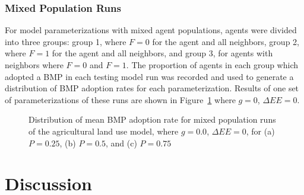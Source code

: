 \subsubsection{Mixed Population Runs}

For model parameterizations with mixed agent populations,
agents were divided into three groups:
group 1, where $F=0$ for the agent and all neighbors,
group 2, where $F=1$ for the agent and all neighbors, and
group 3, for agents with neighbors where $F=0$ and $F=1$. 
The proportion of agents in each group which adopted a BMP in each testing
model run was recorded and used to generate a distribution of BMP adoption
rates for each parameterization.
Results of one set of parameterizations of these runs are shown
in Figure~\ref{fig:farm_res_mix0} where $g=0$, $\Delta EE=0$.

\begin{figure}
    \hfill
    \hfill
    \caption{Distribution of mean BMP adoption rate for mixed population
        runs of the agricultural land use model, where $g=0.0$,
        $\Delta EE=0$,
        for (a) $P=0.25$, (b) $P=0.5$, and (c) $P=0.75$}
    \label{fig:farm_res_mix0}
\end{figure}


\section{Discussion}
\label{sec:farm_disc}

